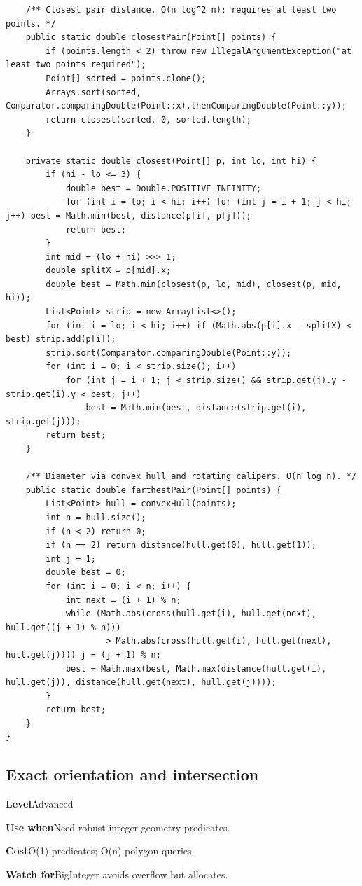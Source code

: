 \documentclass[10pt,letterpaper]{article}
\newcommand{\entrylabel}[1]{\textcolor{accent}{\bfseries #1}}
\begin{document}
\begin{lstlisting}
    /** Closest pair distance. O(n log^2 n); requires at least two points. */
    public static double closestPair(Point[] points) {
        if (points.length < 2) throw new IllegalArgumentException("at least two points required");
        Point[] sorted = points.clone();
        Arrays.sort(sorted, Comparator.comparingDouble(Point::x).thenComparingDouble(Point::y));
        return closest(sorted, 0, sorted.length);
    }

    private static double closest(Point[] p, int lo, int hi) {
        if (hi - lo <= 3) {
            double best = Double.POSITIVE_INFINITY;
            for (int i = lo; i < hi; i++) for (int j = i + 1; j < hi; j++) best = Math.min(best, distance(p[i], p[j]));
            return best;
        }
        int mid = (lo + hi) >>> 1;
        double splitX = p[mid].x;
        double best = Math.min(closest(p, lo, mid), closest(p, mid, hi));
        List<Point> strip = new ArrayList<>();
        for (int i = lo; i < hi; i++) if (Math.abs(p[i].x - splitX) < best) strip.add(p[i]);
        strip.sort(Comparator.comparingDouble(Point::y));
        for (int i = 0; i < strip.size(); i++)
            for (int j = i + 1; j < strip.size() && strip.get(j).y - strip.get(i).y < best; j++)
                best = Math.min(best, distance(strip.get(i), strip.get(j)));
        return best;
    }

    /** Diameter via convex hull and rotating calipers. O(n log n). */
    public static double farthestPair(Point[] points) {
        List<Point> hull = convexHull(points);
        int n = hull.size();
        if (n < 2) return 0;
        if (n == 2) return distance(hull.get(0), hull.get(1));
        int j = 1;
        double best = 0;
        for (int i = 0; i < n; i++) {
            int next = (i + 1) % n;
            while (Math.abs(cross(hull.get(i), hull.get(next), hull.get((j + 1) % n)))
                    > Math.abs(cross(hull.get(i), hull.get(next), hull.get(j)))) j = (j + 1) % n;
            best = Math.max(best, Math.max(distance(hull.get(i), hull.get(j)), distance(hull.get(next), hull.get(j))));
        }
        return best;
    }
}
\end{lstlisting}
\subsection{Exact orientation and intersection}
\begin{guidebox}\small
\entrylabel{Level}\quad Advanced\par
\entrylabel{Use when}\quad Need robust integer geometry predicates.\par
\entrylabel{Cost}\quad O(1) predicates; O(n) polygon queries.\par
\entrylabel{Watch for}\quad BigInteger avoids overflow but allocates.\par
\end{guidebox}
\end{document}

